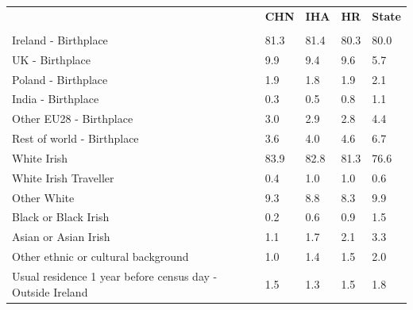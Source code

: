 \documentclass{article}
\begin{document}
\pagebreak
\begin{table}[h]	
\centering
		\begin{tabular}{KTTTT}
  \hline
& \textbf{CHN} & \textbf{IHA} & \textbf{HR}& \textbf{State}\\ 
  \hline
    \\ 
    \hline
Ireland - Birthplace & 81.3& 81.4& 80.3& 80.0\\
UK - Birthplace & 9.9& 9.4& 9.6& 5.7\\
Poland - Birthplace & 1.9& 1.8& 1.9& 2.1\\
India - Birthplace & 0.3& 0.5& 0.8& 1.1\\
Other EU28 - Birthplace & 3.0& 2.9& 2.8& 4.4\\
Rest of world - Birthplace & 3.6& 4.0& 4.6& 6.7\\
    \hline
White Irish & 83.9& 82.8& 81.3& 76.6\\
White Irish Traveller & 0.4& 1.0& 1.0& 0.6\\
Other White & 9.3& 8.8& 8.3& 9.9\\
Black or Black Irish & 0.2& 0.6& 0.9& 1.5\\
Asian or Asian Irish & 1.1& 1.7& 2.1& 3.3\\
Other ethnic or cultural background & 1.0& 1.4& 1.5& 2.0\\
    \hline
Usual residence 1 year before census day - Outside Ireland & 1.5& 1.3& 1.5& 1.8\\


\end{tabular}
\end{table}
\end{document}

